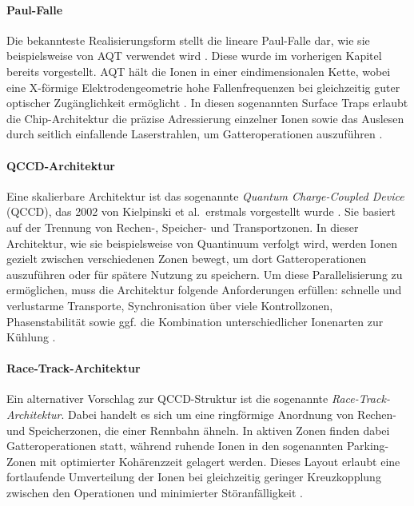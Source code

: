 \paragraph{Paul-Falle}

Die bekannteste Realisierungsform stellt die lineare Paul-Falle dar, wie sie beispielsweise von AQT verwendet wird \cite{bischoff2024}. Diese wurde im vorherigen Kapitel bereits vorgestellt. AQT hält die Ionen in einer eindimensionalen Kette, wobei eine X-förmige Elektrodengeometrie hohe Fallenfrequenzen bei gleichzeitig guter optischer Zugänglichkeit ermöglicht \cite{frisch2024, strohm2024}. In diesen sogenannten Surface Traps erlaubt die Chip-Architektur die präzise Adressierung einzelner Ionen sowie das Auslesen durch seitlich einfallende Laserstrahlen, um Gatteroperationen auszuführen \cite{strohm2024}.

\medskip

\paragraph{QCCD-Architektur}

Eine skalierbare Architektur ist das sogenannte \textit{Quantum Charge-Coupled Device} (QCCD), das 2002 von Kielpinski et al.\ erstmals vorgestellt wurde \cite{kielpinski2002}. Sie basiert auf der Trennung von Rechen-, Speicher- und Transportzonen. In dieser Architektur, wie sie beispielsweise von Quantinuum verfolgt wird, werden Ionen gezielt zwischen verschiedenen Zonen bewegt, um dort Gatteroperationen auszuführen oder für spätere Nutzung zu speichern. Um diese Parallelisierung zu ermöglichen, muss die Architektur folgende Anforderungen erfüllen: schnelle und verlustarme Transporte, Synchronisation über viele Kontrollzonen, Phasenstabilität sowie ggf. die Kombination unterschiedlicher Ionenarten zur Kühlung \cite{strohm2024}.

\medskip

\paragraph{Race-Track-Architektur}

Ein alternativer Vorschlag zur QCCD-Struktur ist die sogenannte \textit{Race-Track-Architektur}. Dabei handelt es sich um eine ringförmige Anordnung von Rechen- und Speicherzonen, die einer Rennbahn ähneln. In aktiven Zonen finden dabei Gatteroperationen statt, während ruhende Ionen in den sogenannten Parking-Zonen mit optimierter Kohärenzzeit gelagert werden. Dieses Layout erlaubt eine fortlaufende Umverteilung der Ionen bei gleichzeitig geringer Kreuzkopplung zwischen den Operationen und minimierter Störanfälligkeit \cite{strohm2024}.

